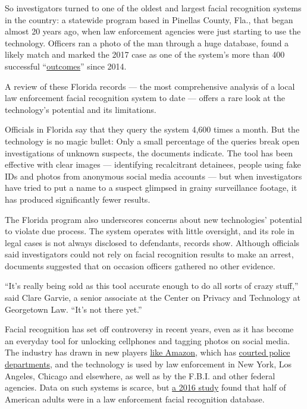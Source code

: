 So investigators turned to one of the oldest and largest facial
recognition systems in the country: a statewide program based in
Pinellas County, Fla., that began almost 20 years ago, when law
enforcement agencies were just starting to use the technology. Officers
ran a photo of the man through a huge database, found a likely match and
marked the 2017 case as one of the system's more than 400 successful
``\href{https://www.documentcloud.org/documents/6586379-FACESlist-Redacted.html}{outcomes}''
since 2014.

A review of these Florida records --- the most comprehensive analysis of
a local law enforcement facial recognition system to date --- offers a
rare look at the technology's potential and its limitations.

Officials in Florida say that they query the system 4,600 times a month.
But the technology is no magic bullet: Only a small percentage of the
queries break open investigations of unknown suspects, the documents
indicate. The tool has been effective with clear images --- identifying
recalcitrant detainees, people using fake IDs and photos from anonymous
social media accounts --- but when investigators have tried to put a
name to a suspect glimpsed in grainy surveillance footage, it has
produced significantly fewer results.

The Florida program also underscores concerns about new technologies'
potential to violate due process. The system operates with little
oversight, and its role in legal cases is not always disclosed to
defendants, records show. Although officials said investigators could
not rely on facial recognition results to make an arrest, documents
suggested that on occasion officers gathered no other evidence.

``It's really being sold as this tool accurate enough to do all sorts of
crazy stuff,'' said Clare Garvie, a senior associate at the Center on
Privacy and Technology at Georgetown Law. ``It's not there yet.''

Facial recognition has set off controversy in recent years, even as it
has become an everyday tool for unlocking cellphones and tagging photos
on social media. The industry has drawn in new players
\href{https://www.cnet.com/news/facial-recognition-overkill-how-deputies-solved-a-12-shoplifting-case/}{like
Amazon}, which has
\href{https://www.nytimes.com/2018/05/22/technology/amazon-facial-recognition.html}{courted
police departments}, and the technology is used by law enforcement in
New York, Los Angeles, Chicago and elsewhere, as well as by the F.B.I.
and other federal agencies. Data on such systems is scarce, but
\href{https://www.perpetuallineup.org/}{a 2016 study} found that half of
American adults were in a law enforcement facial recognition database.

